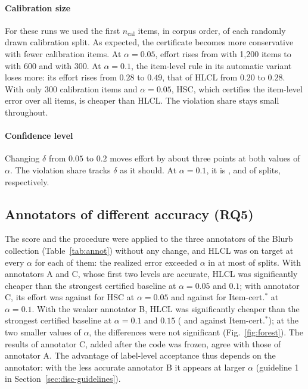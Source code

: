 \documentclass[preprint,12pt]{elsarticle}
\theoremstyle{definition}
\newcommand{\hlcl}{\textup{\textsc{HLCL}}}
\begin{document}
\paragraph{Calibration size}
For these runs we used the first $n_{\mathrm{cal}}$ items, in corpus order, of
each randomly drawn calibration split. As expected, the
certificate becomes more conservative with fewer calibration items. At $\alpha=0.05$, effort rises from  with
1,200 items to  with 600 and
 with 300. At $\alpha=0.1$, the item-level
rule in its automatic variant loses more: its effort rises from $0.28$ to
$0.49$, that of \hlcl{} from $0.20$ to $0.28$. With only 300
calibration items and $\alpha=0.05$, HSC, which certifies the item-level error
over all items, is cheaper than \hlcl{}. The violation share stays small
throughout.

\paragraph{Confidence level}
Changing $\delta$ from $0.05$ to $0.2$ moves effort by about three points at both values of $\alpha$. The violation share tracks $\delta$ as it should. At
$\alpha=0.1$, it is ,
 and  of splits,
respectively.

\subsection{Annotators of different accuracy (RQ5)}
\label{sec:res-annot}

The score and the procedure were applied to the three annotators of the Blurb
collection (Table~\ref{tab:annot}) without any change, and \hlcl{} was on target at every $\alpha$ for each of them: the realized
error exceeded $\alpha$ in at most  of splits.
With annotators A and C, whose first two levels are accurate, \hlcl{} was
significantly cheaper than the strongest certified baseline at $\alpha=0.05$
and $0.1$; with annotator C, its effort was 
against  for HSC at $\alpha=0.05$ and
 against 
for Item-cert.$^\ast$ at $\alpha=0.1$. With the weaker annotator B, \hlcl{} was significantly cheaper than the
strongest certified baseline at $\alpha=0.1$ and $0.15$
( and 
against Item-cert.$^\ast$); at the two smaller values of $\alpha$, the
differences were not significant (Fig.~\ref{fig:forest}). The results of
annotator C, added after the code was frozen, agree with those of annotator A.
The advantage of label-level acceptance thus depends on the annotator: with
the less accurate annotator B it appears at larger $\alpha$ (guideline 1 in
Section~\ref{sec:disc-guidelines}).
\end{document}
